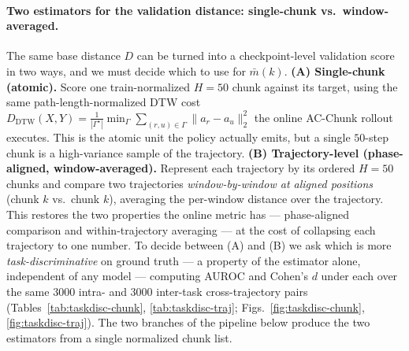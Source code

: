 \documentclass[11pt]{article}
\begin{document}
\paragraph{Two estimators for the validation distance: single-chunk vs.\ window-averaged.} The same
base distance $D$ can be turned into a checkpoint-level validation score in two ways, and we must decide
which to use for $\bar m(k)$. \textbf{(A) Single-chunk (atomic).} Score one train-normalized $H{=}50$
chunk against its target, using the same path-length-normalized DTW cost
$D_{\text{DTW}}(X,Y) = \frac{1}{|\Gamma^\star|}\min_{\Gamma}\sum_{(r,u)\in\Gamma}\lVert a_r - a_u\rVert_2^2$
the online AC-Chunk rollout executes. This is the atomic unit the policy actually emits, but a single
$50$-step chunk is a high-variance sample of the trajectory. \textbf{(B) Trajectory-level (phase-aligned,
window-averaged).} Represent each trajectory by its ordered $H{=}50$ chunks and compare two trajectories
\emph{window-by-window at aligned positions} (chunk $k$ vs.\ chunk $k$), averaging the per-window distance
over the trajectory. This restores the two properties the online metric has --- phase-aligned comparison
and within-trajectory averaging --- at the cost of collapsing each trajectory to one number. To decide
between (A) and (B) we ask which is more \emph{task-discriminative} on ground truth --- a property of the
estimator alone, independent of any model --- computing AUROC and Cohen's $d$ under each over the same
$3000$ intra- and $3000$ inter-task cross-trajectory pairs (Tables~\ref{tab:taskdisc-chunk},
\ref{tab:taskdisc-traj}; Figs.~\ref{fig:taskdisc-chunk}, \ref{fig:taskdisc-traj}). The two branches of the
pipeline below produce the two estimators from a single normalized chunk list.
\end{document}
